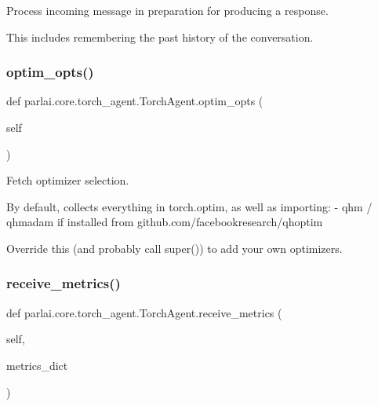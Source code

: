 \begin{DoxyVerb}Process incoming message in preparation for producing a response.

This includes remembering the past history of the conversation.
\end{DoxyVerb}
 \mbox{\label{classparlai_1_1core_1_1torch__agent_1_1TorchAgent_a9c622b8ed5a811841f30fe98cc297cde}} 
\subsubsection{\texorpdfstring{optim\+\_\+opts()}{optim\_opts()}}
{\footnotesize\ttfamily def parlai.\+core.\+torch\+\_\+agent.\+Torch\+Agent.\+optim\+\_\+opts (\begin{DoxyParamCaption}\item[{}]{self }\end{DoxyParamCaption})}

\begin{DoxyVerb}Fetch optimizer selection.

By default, collects everything in torch.optim, as well as importing:
- qhm / qhmadam if installed from github.com/facebookresearch/qhoptim

Override this (and probably call super()) to add your own optimizers.
\end{DoxyVerb}
 \mbox{\label{classparlai_1_1core_1_1torch__agent_1_1TorchAgent_a02beaaedfa30463f9d0a97ea590b516f}} 
\subsubsection{\texorpdfstring{receive\+\_\+metrics()}{receive\_metrics()}}
{\footnotesize\ttfamily def parlai.\+core.\+torch\+\_\+agent.\+Torch\+Agent.\+receive\+\_\+metrics (\begin{DoxyParamCaption}\item[{}]{self,  }\item[{}]{metrics\+\_\+dict }\end{DoxyParamCaption})}

